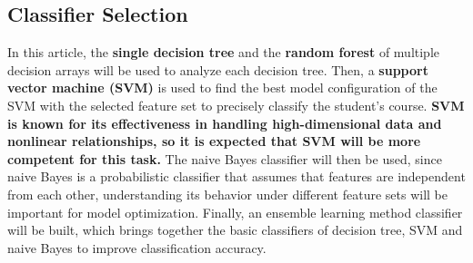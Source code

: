 \documentclass[twocolumn]{IEEEtran}
\begin{document}
\subsection{Classifier Selection}
In this article, the \textbf{single decision tree} and the \textbf{random forest} of multiple decision arrays will be used to analyze each decision tree. Then, a \textbf{support vector machine (SVM)} is used to find the best model configuration of the SVM with the selected feature set to precisely classify the student's course. \textbf{SVM is known for its effectiveness in handling high-dimensional data and nonlinear relationships, so it is expected that SVM will be more competent for this task.} The naive Bayes classifier will then be used, since naive Bayes is a probabilistic classifier that assumes that features are independent from each other, understanding its behavior under different feature sets will be important for model optimization. Finally, an ensemble learning method classifier will be built, which brings together the basic classifiers of decision tree, SVM and naive Bayes to improve classification accuracy.

\end{document}
